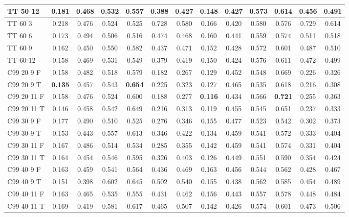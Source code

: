 \documentclass{article}
\begin{document}
\begin{tabular}{|l|c|c|c|c|c|c|c|c|c|c|c|c|}
TT 50 12 & 0.181 & 0.468 & 0.532 & 0.557 & 0.388 & 0.427 & 0.148 & 0.427 & 0.573 & 0.614 & 0.456 & 0.491\\ \hline
TT 60  3 & 0.218 & 0.476 & 0.524 & 0.525 & 0.728 & 0.580 & 0.166 & 0.420 & 0.580 & 0.576 & 0.729 & 0.614\\ \hline
TT 60  6 & 0.173 & 0.494 & 0.506 & 0.516 & 0.474 & 0.468 & 0.160 & 0.441 & 0.559 & 0.574 & 0.511 & 0.518\\ \hline
TT 60  9 & 0.162 & 0.450 & 0.550 & 0.582 & 0.437 & 0.471 & 0.152 & 0.428 & 0.572 & 0.601 & 0.487 & 0.510\\ \hline
TT 60 12 & 0.158 & 0.469 & 0.531 & 0.549 & 0.379 & 0.419 & 0.150 & 0.424 & 0.576 & 0.611 & 0.472 & 0.499\\ \hline
C99 20  9 F & 0.158 & 0.482 & 0.518 & 0.579 & 0.182 & 0.267 & 0.129 & 0.452 & 0.548 & 0.669 & 0.226 & 0.326\\ \hline
C99 20  9 T & \textbf{0.135} & 0.457 & 0.543 & \textbf{0.654} & 0.225 & 0.323 & 0.127 & 0.465 & 0.535 & 0.618 & 0.216 & 0.308\\ \hline
C99 20 11 F & 0.158 & 0.476 & 0.524 & 0.600 & 0.188 & 0.277 & \textbf{0.116} & 0.434 & 0.566 & \textbf{0.721} & 0.255 & 0.363\\ \hline
C99 20 11 T & 0.146 & 0.458 & 0.542 & 0.649 & 0.216 & 0.313 & 0.119 & 0.455 & 0.545 & 0.651 & 0.237 & 0.333\\ \hline
C99 30  9 F & 0.177 & 0.490 & 0.510 & 0.525 & 0.276 & 0.346 & 0.155 & 0.477 & 0.523 & 0.542 & 0.302 & 0.373\\ \hline
C99 30  9 T & 0.153 & 0.443 & 0.557 & 0.613 & 0.346 & 0.422 & 0.134 & 0.459 & 0.541 & 0.572 & 0.333 & 0.404\\ \hline
C99 30 11 F & 0.167 & 0.486 & 0.514 & 0.534 & 0.285 & 0.355 & 0.142 & 0.459 & 0.541 & 0.574 & 0.331 & 0.404\\ \hline
C99 30 11 T & 0.164 & 0.454 & 0.546 & 0.595 & 0.326 & 0.403 & 0.126 & 0.449 & 0.551 & 0.590 & 0.354 & 0.424\\ \hline
C99 40  9 F & 0.163 & 0.459 & 0.541 & 0.564 & 0.436 & 0.469 & 0.163 & 0.456 & 0.544 & 0.562 & 0.428 & 0.467\\ \hline
C99 40  9 T & 0.151 & 0.398 & 0.602 & 0.645 & 0.502 & 0.540 & 0.155 & 0.438 & 0.562 & 0.585 & 0.454 & 0.489\\ \hline
C99 40 11 F & 0.163 & 0.465 & 0.535 & 0.555 & 0.431 & 0.462 & 0.156 & 0.443 & 0.557 & 0.578 & 0.448 & 0.484\\ \hline
C99 40 11 T & 0.169 & 0.419 & 0.581 & 0.617 & 0.465 & 0.507 & 0.142 & 0.426 & 0.574 & 0.601 & 0.473 & 0.506\\ \hline

\end{tabular}
\end{document}
